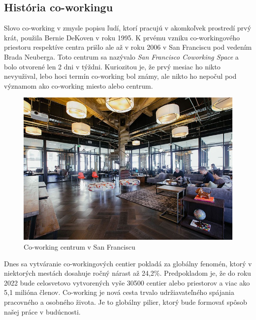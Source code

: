 \subsection{História co-workingu}
\indent Slovo co-working v zmysle popisu ľudí, ktorí pracujú v akomkoľvek prostredí prvý krát, použila Bernie DeKoven v roku 1995. K prvému vzniku co-workingového priestoru respektíve centra prišlo ale až v roku 2006 v San Franciscu pod vedením Brada Neuberga. Toto centrum sa nazývalo \textit{San Francisco Coworking Space} a bolo otvorené len 2 dni v týždni. Kuriozitou je, že prvý mesiac ho nikto nevyužival, lebo hoci termín co-working bol známy, ale nikto ho nepočul pod významom ako co-working miesto alebo centrum. 

\begin{figure}[H]
    \centering
    \includegraphics[scale=0.50]{img/coworking_space.jpg}
    \caption{Co-working centrum v San Franciscu}
    \label{fig:img-co-space}
\end{figure}

\indent Dnes sa vytváranie co-workingových centier pokladá za globálny fenomén, ktorý v niektorých mestách dosahuje ročný nárast až 24,2\%. Predpokladom je, že do roku 2022 bude celosvetovo vytvorených vyše 30500 centier alebo priestorov a viac ako 5,1 milióna členov. Co-working je nová cesta trvalo udržiavateľného spájania pracovného a osobného života. Je to globálny pilier, ktorý bude formovať spôsob našej práce v budúcnosti. 

